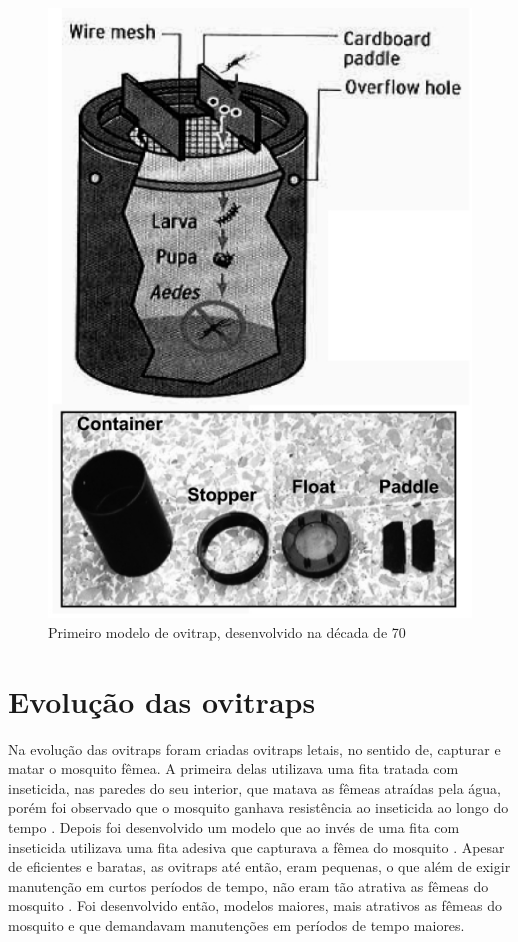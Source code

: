 \documentclass[
	12pt,				%
	openright,			%
	oneside,			%
	a4paper,			%
	chapter=TITLE,		%
	english,			%
	brazil				%
	]{abntex2}
\begin{document}
\begin{figure}[h!]
\centering
\includegraphics[scale=1.6]{imagens/ovitrapLoki.jpg}
\caption{Primeiro modelo de ovitrap, desenvolvido na década de 70}
    \label{fig:OvitrapLoki}
\end{figure}

\section{Evolução das ovitraps}

Na evolução das ovitraps foram criadas ovitraps letais, no sentido de, capturar e matar o mosquito fêmea. A primeira delas utilizava uma fita
tratada com inseticida, nas paredes do seu interior, que matava as fêmeas atraídas pela
água, porém foi observado que o mosquito ganhava resistência ao inseticida ao longo do
tempo \cite{BRIANJJOHNSON2017}. Depois foi desenvolvido um modelo que ao invés de uma fita com inseticida
utilizava uma fita adesiva que capturava a fêmea do mosquito \cite{BRIANJJOHNSON2017}. Apesar de eficientes e 
baratas, as ovitraps até então, eram pequenas, o que além de exigir manutenção em curtos
períodos de tempo, não eram tão atrativa as fêmeas do mosquito \cite{BRIANJJOHNSON2017}. Foi desenvolvido
então, modelos maiores, mais atrativos as fêmeas do mosquito e que demandavam
manutenções em períodos de tempo maiores.
\end{document}
